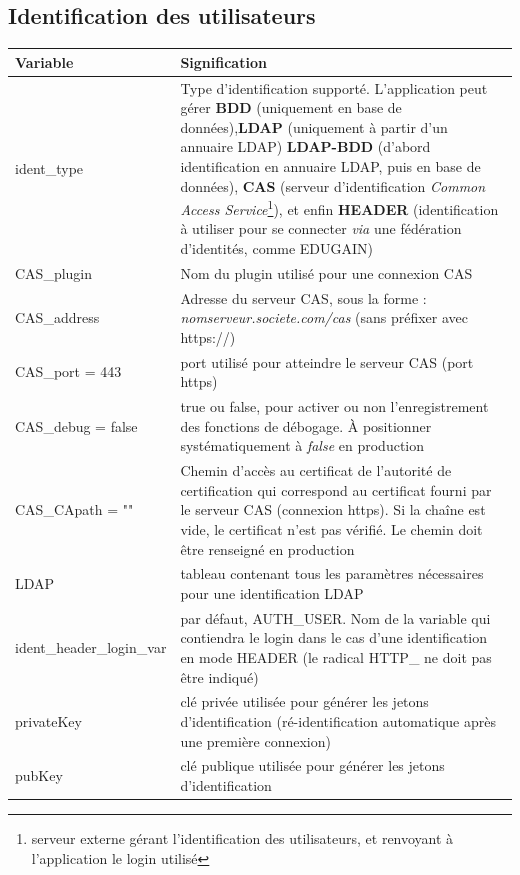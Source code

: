 \subsection{Identification des utilisateurs}

\begin{longtable}{|p{6cm}|p{10cm}|}
\hline
\textbf{Variable} & \textbf{Signification} \\
\hline
\endhead
ident\_type & Type d'identification supporté. L'application peut gérer \textbf{BDD} (uniquement en base de données),\textbf{LDAP} (uniquement à partir d'un annuaire LDAP) \textbf{LDAP-BDD} (d'abord identification en annuaire LDAP, puis en base de données), \textbf{CAS} (serveur d'identification \textit{Common Access Service}\footnote{serveur externe gérant l'identification des utilisateurs, et renvoyant à l'application le login utilisé}), et enfin \textbf{HEADER} (identification à utiliser pour se connecter \textit{via} une fédération d'identités, comme EDUGAIN)\\
\hline
CAS\_plugin & Nom du plugin utilisé pour une connexion CAS \\
\hline
CAS\_address & Adresse du serveur CAS, sous la forme : \textit{nomserveur.societe.com/cas} (sans préfixer avec https://)\\
\hline
CAS\_port = 443 & port utilisé pour atteindre le serveur CAS (port https)\\
\hline
CAS\_debug = false & true ou false, pour activer ou non l'enregistrement des fonctions de débogage. À positionner systématiquement à \textit{false} en production \\
\hline
CAS\_CApath = "" & Chemin d'accès au certificat de l'autorité de certification qui correspond au certificat fourni par le serveur CAS (connexion https). Si la chaîne est vide, le certificat n'est pas vérifié. Le chemin doit être renseigné en production \\
\hline
LDAP & tableau contenant tous les paramètres nécessaires pour une identification LDAP \\
\hline
ident\_header\_login\_var & par défaut, AUTH\_USER. Nom de la variable qui contiendra le login dans le cas d'une identification en mode HEADER (le radical HTTP\_  ne doit pas être indiqué) \\
\hline
privateKey & clé privée utilisée pour générer les jetons d'identification (ré-identification automatique après une première connexion) \\
\hline
pubKey & clé publique utilisée pour générer les jetons d'identification \\

\end{longtable}
